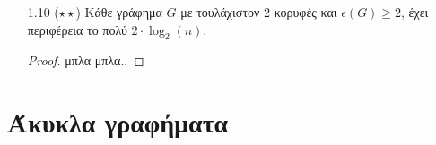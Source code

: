 \documentclass[a4paper, oneside, 11pt]{article}
\begin{document}
\begin{enumerate}
\begin{proof}
      Ισχύει όμως:

      \[ 2m(G) = \sum_{u \in V(G)} d(u) \geq
         \sum_{u \in V(G): d(u) \geq 2\alpha\delta*(G)} d(u)
         \geq \frac1\alpha n(G) \cdot 2\alpha\delta*(G)
         = 2n(G)\delta^*(G) \]

      \[ m(G) \geq n(G) \cdot \delta^*(G) \Leftrightarrow
         \epsilon(G) \geq \delta^*(G) \]

      Από το Πόρισμα 3.1 των σημειώσεων του μαθήματος γνωρίζουμε ότι
      $\delta^*(G) \geq \epsilon(G)$, συνεπώς θα έχουμε:

      \[ \epsilon(G) = \delta^*(G) \]

      TODO: Εδώ καταλήγουμε σε άτοπο γιατί αν ισχύει ισότητα τότε οι
      παραπάνω ανισότητες είναι αυστηρές και αυτό δεν μπορεί να ισχύει
      $[ \ldots ]$

   \end{proof}

\item[1.10 ($\star\star$)]
   Κάθε γράφημα $G$ με τουλάχιστον 2 κορυφές και
   $\epsilon(G) \geq 2$, έχει περιφέρεια το πολύ $2 \cdot \log_2 (n)$.

   \begin{proof}
      μπλα μπλα..
   \end{proof}
\end{enumerate}

\section{Άκυκλα γραφήματα}
\end{document}
